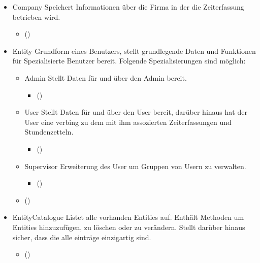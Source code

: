         \begin{itemize}
            \item{Company}
                Speichert Informationen über die Firma in der die Zeiterfassung betrieben wird.
                \begin{itemize}
                    \item()
                \end{itemize}

            \item{Entity}
                Grundform eines Benutzers, stellt grundlegende Daten und Funktionen für Spezialisierte Benutzer bereit.
                Folgende Spezialisierungen sind möglich:
                \begin{itemize}
                    \item{Admin}
                        Stellt Daten für und über den Admin bereit.
                    \begin{itemize}
                        \item()
                    \end{itemize}

                    \item{User}
                        Stellt Daten für und über den User bereit, darüber hinaus hat der User eine verbing zu dem mit ihm assozierten Zeiterfassungen und Stundenzetteln.
                        \begin{itemize}
                            \item()
                        \end{itemize}

                    \item{Supervisor}
                        Erweiterung des User um Gruppen von Usern zu verwalten.
                        \begin{itemize}
                            \item()
                        \end{itemize}

                \end{itemize}
                \begin{itemize}
                    \item()
                \end{itemize}

            \item{EntityCatalogue}
                Listet alle vorhanden Entities auf. Enthält Methoden um Entities hinzuzufügen, zu löschen oder zu verändern. Stellt darüber hinaus sicher, dass die alle einträge einzigartig sind.
                \begin{itemize}
                    \item()
                \end{itemize}


\end{itemize}
